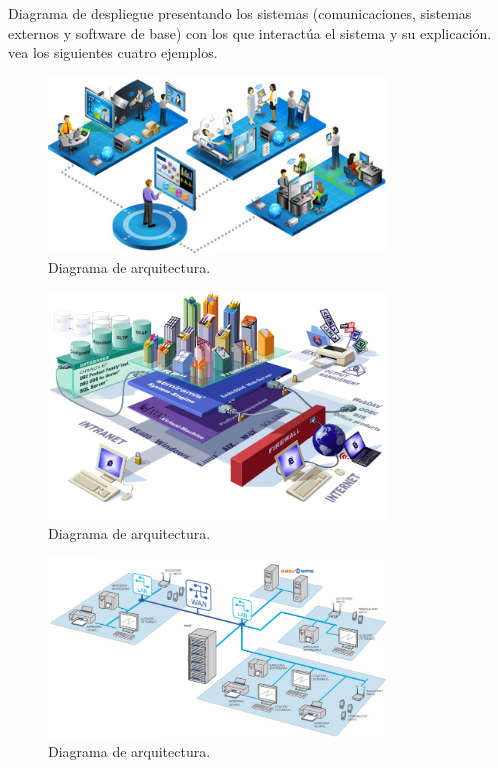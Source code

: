 Diagrama de despliegue presentando los sistemas (comunicaciones, sistemas externos y software de base) con los que interactúa el sistema y su explicación. vea los siguientes cuatro ejemplos.

	\begin{figure}[htbp!]
		\centering
			\includegraphics[width=0.8\textwidth]{images/arquitectura1}
		\caption{Diagrama de arquitectura.}
	\end{figure}

	\begin{figure}[htbp!]
		\centering
			\includegraphics[width=0.8\textwidth]{images/arquitectura2}
		\caption{Diagrama de arquitectura.}
	\end{figure}

	\begin{figure}[htbp!]
		\centering
			\includegraphics[width=0.8\textwidth]{images/arquitectura3}
		\caption{Diagrama de arquitectura.}
	\end{figure}

